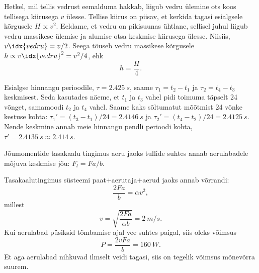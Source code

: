 \documentclass[10pt]{article}
\begin{document}
{%

\solu
Hetkel, mil tellis vedrust eemalduma hakkab, liigub vedru ülemine ots koos tellisega kiirusega $v$ ülesse. Tellise kiirus on piisav, et kerkida tagasi esialgsele kõrgusele $H\propto v^2$. Eeldame, et vedru on pikisuunas ühtlane, sellisel juhul liigub vedru massikese ülemise ja alumise otsa keskmise kiirusega ülesse. Niisiis, $v\idx{vedru}=v/2$. Seega tõuseb vedru massikese kõrgusele $h\propto v\idx{vedru}^2=v^2/4$, ehk
\[h=\frac{H}{4}.\]
\probend
\bigskip


\solu
Esialgse hinnangu perioodile, $\tau = \SI{2,425}{s}$, saame $\tau_1 = t_2 - t_1$ ja $\tau_2 = t_4 - t_3$
keskmisest. Seda kasutades näeme, et $t_1$ ja $t_3$ vahel pidi toimuma täpselt \num{24} võnget,
samamoodi $t_2$ ja $t_4$ vahel. Saame kaks sõltumatut mõõtmist \num{24} võnke kestuse kohta:
$\tau_1' = (t_3-t_1)/\num{24} = \SI{2,4146}{s}$ ja $\tau_2'= (t_4-t_2)/\num{24} = \SI{2,4125}{s}$. Nende keskmine annab
meie hinnangu pendli perioodi kohta, $\tau' = \SI{2,4135}{s} \approx \SI{2,414}{s}$.
\probend
\bigskip


\solu
Jõumomentide tasakaalu tingimus aeru jaoks tullide suhtes annab aerulabadele mõjuva keskmise jõu: $F_l = F a/b$.

Tasakaalutingimus süsteemi paat+aerutaja+aerud jaoks annab võrrandi: 
\[
\frac{2Fa}{b} = \alpha v^2 ,
\]
millest
\[
v=\sqrt{\frac{2 F a}{\alpha b}}=\SI{2}{m/s}.
\]
Kui aerulabad püsiksid tõmbamise ajal vee suhtes paigal, siis oleks võimsus
\[
P=\frac{2 v F a}{b}=\SI{160}{W}.
\]
Et aga aerulabad nihkuvad ilmselt veidi tagasi, siis on tegelik võimsus mõnevõrra suurem.
\probend
\bigskip


}
\end{document}
